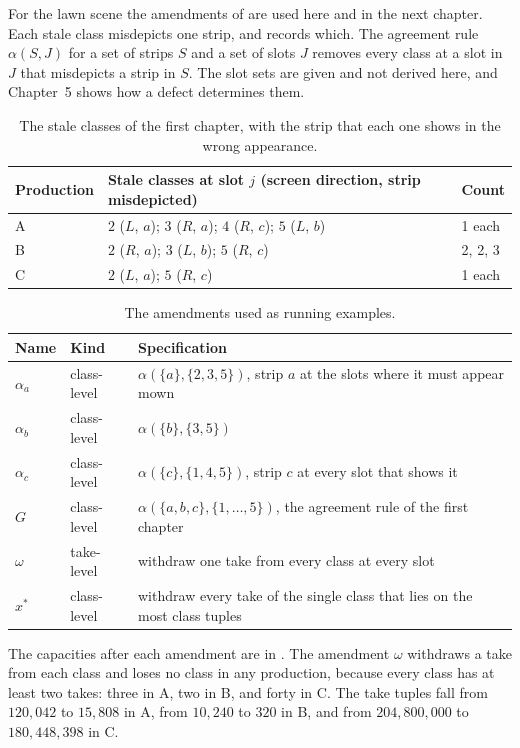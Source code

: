 \documentclass[11pt,twoside,openright]{book}
\theoremstyle{plain}
\theoremstyle{definition}
\theoremstyle{remark}
\begin{document}
For the lawn scene the amendments of  are used here and in the next chapter. Each stale class misdepicts one strip, and  records which. The agreement rule $\alpha(S,J)$ for a set of strips $S$ and a set of slots $J$ removes every class at a slot in $J$ that misdepicts a strip in $S$. The slot sets are given and not derived here, and Chapter~5 shows how a defect determines them.

\begin{table}[ht]
\centering
\begin{tabular}{@{}lll@{}}
\toprule
Production & Stale classes at slot $j$ (screen direction, strip misdepicted) & Count\\
\midrule
A & $2$ ($L$, $a$); $3$ ($R$, $a$); $4$ ($R$, $c$); $5$ ($L$, $b$) & 1 each\\
B & $2$ ($R$, $a$); $3$ ($L$, $b$); $5$ ($R$, $c$) & 2, 2, 3\\
C & $2$ ($L$, $a$); $5$ ($R$, $c$) & 1 each\\
\bottomrule
\end{tabular}
\caption{The stale classes of the first chapter, with the strip that each one shows in the wrong appearance.}\label{tab:stale}
\end{table}

\begin{table}[ht]
\centering
\begin{tabular}{@{}llp{9cm}@{}}
\toprule
Name & Kind & Specification\\
\midrule
$\alpha_a$ & class-level & $\alpha(\{a\},\{2,3,5\})$, strip $a$ at the slots where it must appear mown\\
$\alpha_b$ & class-level & $\alpha(\{b\},\{3,5\})$\\
$\alpha_c$ & class-level & $\alpha(\{c\},\{1,4,5\})$, strip $c$ at every slot that shows it\\
$G$ & class-level & $\alpha(\{a,b,c\},\{1,\dots,5\})$, the agreement rule of the first chapter\\
$\omega$ & take-level & withdraw one take from every class at every slot\\
$x^\ast$ & class-level & withdraw every take of the single class that lies on the most class tuples\\
\bottomrule
\end{tabular}
\caption{The amendments used as running examples.}\label{tab:amendments}
\end{table}

The capacities after each amendment are in . The amendment $\omega$ withdraws a take from each class and loses no class in any production, because every class has at least two takes: three in A, two in B, and forty in C. The take tuples fall from $120{,}042$ to $15{,}808$ in A, from $10{,}240$ to $320$ in B, and from $204{,}800{,}000$ to $180{,}448{,}398$ in C.
\end{document}
